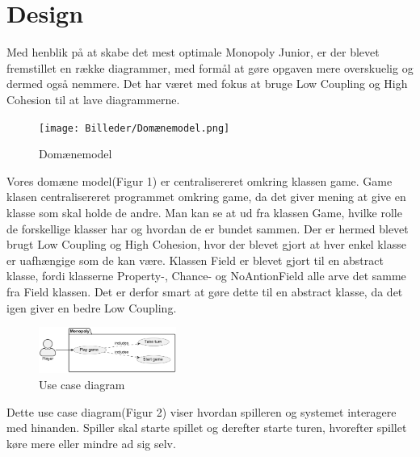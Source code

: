 \documentclass{article}
\begin{document}
\section{Design}
Med henblik på at skabe det mest optimale Monopoly Junior, er der blevet fremstillet en række diagrammer, med formål at gøre opgaven mere overskuelig og dermed også nemmere. Det har været med fokus 	at bruge Low Coupling og High Cohesion til at lave diagrammerne.
\\

\begin{figure} [h]
    \centering
    \texttt{[image: Billeder/Domænemodel.png]}
    \caption{Domænemodel}
    \label{Domænemodel}
\end{figure}
Vores domæne model(Figur 1) er centralisereret omkring klassen game. Game klasen centralisereret programmet omkring game, da det giver mening at give en klasse som skal holde de andre. Man kan se at ud fra klassen Game, hvilke rolle de forskellige klasser har og hvordan de er bundet sammen. Der er hermed blevet brugt Low Coupling og High Cohesion, hvor der blevet gjort at hver enkel klasse er uafhængige som de kan være.  Klassen Field er blevet gjort til en abstract klasse, fordi klasserne Property-, Chance- og NoAntionField alle arve det samme fra Field klassen. Det er derfor smart at gøre dette til en abstract klasse, da det igen giver en bedre Low Coupling.
\\


\begin{figure} [h]
    \centering
    \includegraphics[width = 0.4\textwidth]{Billeder/Usecasediagram.png}
    \caption{Use case diagram}
    \label{Use case diagram}
\end{figure}
Dette use case diagram(Figur 2) viser hvordan spilleren og systemet interagere med hinanden. Spiller skal starte spillet og derefter starte turen, hvorefter spillet køre mere eller mindre ad sig selv. 
\\
\end{document}

